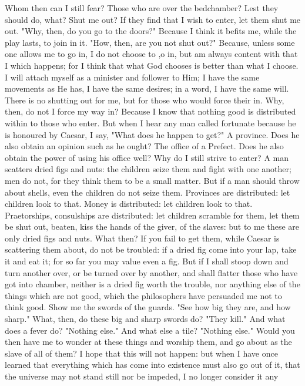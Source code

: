 \documentclass[a4paper]{article}
\begin{document}
    Whom then can I still fear? Those who are over the bedchamber? Lest they
should do, what? Shut me out? If they find that I wish to enter, let them shut
me out. "Why, then, do you go to the doors?" Because I think it befits me,
while the play lasts, to join in it. "How, then, are you not shut out?"
Because, unless some one allows me to go in, I do not choose to ,o in, but am
always content with that I which happens; for I think that what God chooses is
better than what I choose. I will attach myself as a minister and follower to
Him; I have the same movements as He has, I have the same desires; in a word, I
have the same will. There is no shutting out for me, but for those who would
force their in. Why, then, do not I force my way in? Because I know that
nothing good is distributed within to those who enter. But when I hear any man
called fortunate because he is honoured by Caesar, I say, "What does he happen
to get?" A province. Does he also obtain an opinion such as he ought? The
office of a Prefect. Does he also obtain the power of using his office well?
Why do I still strive to enter? A man scatters dried figs and nuts: the
children seize them and fight with one another; men do not, for they think them
to be a small matter. But if a man should throw about shells, even the children
do not seize them. Provinces are distributed: let children look to that. Money
is distributed: let children look to that. Praetorships, consulships are
distributed: let children scramble for them, let them be shut out, beaten, kiss
the hands of the giver, of the slaves: but to me these are only dried figs and
nuts. What then? If you fail to get them, while Caesar is scattering them
about, do not be troubled: if a dried fig come into your lap, take it and eat
it; for so far you may value even a fig. But if I shall stoop down and turn
another over, or be turned over by another, and shall flatter those who have
got into chamber, neither is a dried fig worth the trouble, nor anything else
of the things which are not good, which the philosophers have persuaded me not
to think good.
    Show me the swords of the guards. "See how big they are, and how sharp."
What, then, do these big and sharp swords do? "They kill." And what does a
fever do? "Nothing else." And what else a tile? "Nothing else." Would you then
have me to wonder at these things and worship them, and go about as the slave
of all of them? I hope that this will not happen: but when I have once learned
that everything which has come into existence must also go out of it, that the
universe may not stand still nor be impeded, I no longer consider it any
\end{document}
